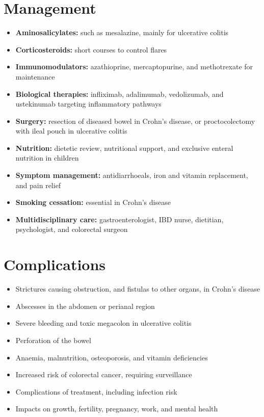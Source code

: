 \section*{Management}
\begin{itemize}
    \item \textbf{Aminosalicylates:} such as mesalazine, mainly for ulcerative colitis
    \item \textbf{Corticosteroids:} short courses to control flares
    \item \textbf{Immunomodulators:} azathioprine, mercaptopurine, and methotrexate for maintenance
    \item \textbf{Biological therapies:} infliximab, adalimumab, vedolizumab, and ustekinumab targeting inflammatory pathways
    \item \textbf{Surgery:} resection of diseased bowel in Crohn's disease, or proctocolectomy with ileal pouch in ulcerative colitis
    \item \textbf{Nutrition:} dietetic review, nutritional support, and exclusive enteral nutrition in children
    \item \textbf{Symptom management:} antidiarrhoeals, iron and vitamin replacement, and pain relief
    \item \textbf{Smoking cessation:} essential in Crohn's disease
    \item \textbf{Multidisciplinary care:} gastroenterologist, IBD nurse, dietitian, psychologist, and colorectal surgeon
\end{itemize}

\section*{Complications}
\begin{itemize}
    \item Strictures causing obstruction, and fistulas to other organs, in Crohn's disease
    \item Abscesses in the abdomen or perianal region
    \item Severe bleeding and toxic megacolon in ulcerative colitis
    \item Perforation of the bowel
    \item Anaemia, malnutrition, osteoporosis, and vitamin deficiencies
    \item Increased risk of colorectal cancer, requiring surveillance
    \item Complications of treatment, including infection risk
    \item Impacts on growth, fertility, pregnancy, work, and mental health
\end{itemize}

